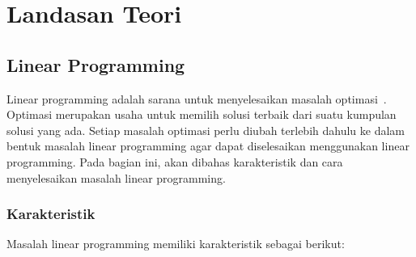 \chapter{Landasan Teori}
\label{chap:teori}

\section{Linear Programming~\cite{winston2004operations}}

Linear programming adalah sarana untuk menyelesaikan masalah optimasi~\cite{winston2004operations}. Optimasi merupakan usaha untuk memilih solusi terbaik dari suatu kumpulan solusi yang ada. Setiap masalah optimasi perlu diubah terlebih dahulu ke dalam bentuk masalah linear programming agar dapat diselesaikan menggunakan linear programming. Pada bagian ini, akan dibahas karakteristik dan cara menyelesaikan masalah linear programming.

\subsection{Karakteristik}
Masalah linear programming memiliki karakteristik sebagai berikut:

